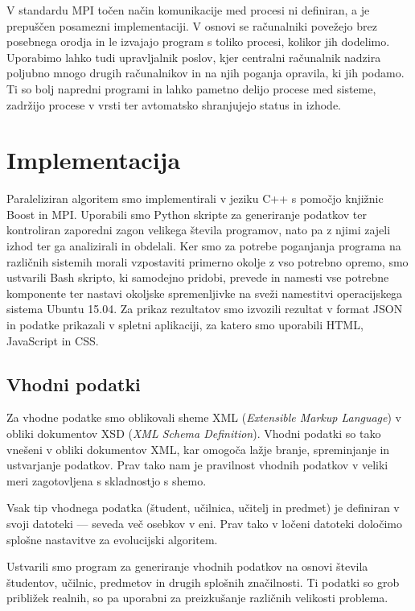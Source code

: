 \documentclass[a4paper,12pt]{book}
\begin{document}
V standardu MPI točen način komunikacije med procesi ni definiran, a je prepuščen posamezni implementaciji. V osnovi se računalniki povežejo brez posebnega orodja in le izvajajo program s toliko procesi, kolikor jih dodelimo. Uporabimo lahko tudi upravljalnik poslov, kjer centralni računalnik nadzira poljubno mnogo drugih računalnikov in na njih poganja opravila, ki jih podamo. Ti so bolj napredni programi in lahko pametno delijo procese med sisteme, zadržijo procese v vrsti ter avtomatsko shranjujejo status in izhode. 



\chapter{Implementacija}
Paraleliziran algoritem smo implementirali v jeziku C++ s pomočjo knjižnic Boost in MPI. Uporabili smo Python skripte za generiranje podatkov ter kontroliran zaporedni zagon velikega števila programov, nato pa z njimi zajeli izhod ter ga analizirali in obdelali. Ker smo za potrebe poganjanja programa na različnih sistemih morali vzpostaviti primerno okolje z vso potrebno opremo, smo ustvarili Bash skripto, ki samodejno pridobi, prevede in namesti vse potrebne komponente ter nastavi okoljske spremenljivke na sveži namestitvi operacijskega sistema Ubuntu 15.04. Za prikaz rezultatov smo izvozili rezultat v format JSON in podatke prikazali v spletni aplikaciji, za katero smo uporabili HTML, JavaScript in CSS. 


\section{Vhodni podatki}
Za vhodne podatke smo oblikovali sheme XML (\emph{Extensible Markup Language}) v obliki dokumentov XSD (\emph{XML Schema Definition}). Vhodni podatki so tako vnešeni v obliki dokumentov XML, kar omogoča lažje branje, spreminjanje in ustvarjanje podatkov. Prav tako nam je pravilnost vhodnih podatkov v veliki meri zagotovljena s skladnostjo s shemo. 

Vsak tip vhodnega podatka (študent, učilnica, učitelj in predmet) je definiran v svoji datoteki --- seveda več osebkov v eni. Prav tako v ločeni datoteki določimo splošne nastavitve za evolucijski algoritem. 

Ustvarili smo program za generiranje vhodnih podatkov na osnovi števila študentov, učilnic, predmetov in drugih splošnih značilnosti. Ti podatki so grob približek realnih, so pa uporabni za preizkušanje različnih velikosti problema. 
\end{document}
